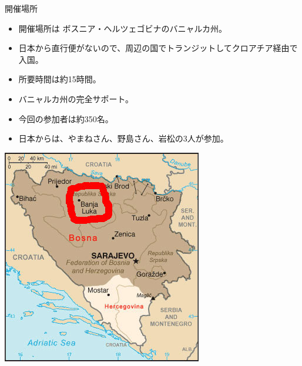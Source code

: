 \begin{frame}{開催場所}
\begin{minipage}{0.6\hsize}
\begin{itemize}
\item 開催場所は ボスニア・ヘルツェゴビナのバニャルカ州。
\item 日本から直行便がないので、周辺の国でトランジットしてクロアチア経由で入国。
\item 所要時間は約15時間。
\item バニャルカ州の完全サポート。
\item 今回の参加者は約350名。
\item 日本からは、やまねさん、野島さん、岩松の3人が参加。
\end{itemize}
\end{minipage}
\begin{minipage}{0.35\hsize}
\includegraphics[width=1.4\hsize]{image201108/debconf11_map.jpg}
\end{minipage}
\end{frame}

